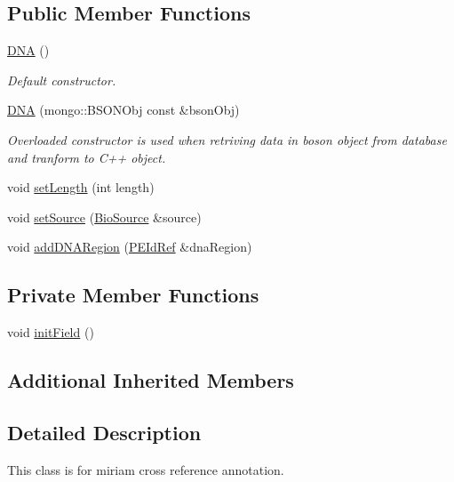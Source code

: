 \subsection*{Public Member Functions}
\begin{DoxyCompactItemize}
\item 
\hyperlink{classunisys_1_1DNA_a04f18838e08019bc77fa915c862f2101}{D\-N\-A} ()
\begin{DoxyCompactList}\small\item\em Default constructor. \end{DoxyCompactList}\item 
\hyperlink{classunisys_1_1DNA_a938775f5235b21afabc2b67337e432d9}{D\-N\-A} (mongo\-::\-B\-S\-O\-N\-Obj const \&bson\-Obj)
\begin{DoxyCompactList}\small\item\em Overloaded constructor is used when retriving data in boson object from database and tranform to C++ object. \end{DoxyCompactList}\item 
void \hyperlink{classunisys_1_1DNA_aa27eef63f50cceb6da6151b3298f15e9}{set\-Length} (int length)
\item 
void \hyperlink{classunisys_1_1DNA_acf51d4eb773620fd9b622e89539e28c3}{set\-Source} (\hyperlink{classunisys_1_1BioSource}{Bio\-Source} \&source)
\item 
void \hyperlink{classunisys_1_1DNA_aa368cd88c26fd4f81e555fbbfc5f3901}{add\-D\-N\-A\-Region} (\hyperlink{classunisys_1_1PEIdRef}{P\-E\-Id\-Ref} \&dna\-Region)
\end{DoxyCompactItemize}
\subsection*{Private Member Functions}
\begin{DoxyCompactItemize}
\item 
void \hyperlink{classunisys_1_1DNA_aa33eff29fbf57aa7c626999ade40910d}{init\-Field} ()
\end{DoxyCompactItemize}
\subsection*{Additional Inherited Members}


\subsection{Detailed Description}
This class is for miriam cross reference annotation. 

